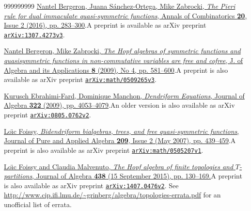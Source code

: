 \documentclass[numbers=enddot,12pt,final,onecolumn,notitlepage,abstracton]{scrartcl}%
\theoremstyle{definition}
\begin{document}
\begin{thebibliography}{999999999}
%
\href{https://doi.org/10.1007/s00026-016-0303-3}{Nantel Bergeron, Juana
S\'{a}nchez-Ortega, Mike Zabrocki, \textit{The Pieri rule for dual immaculate
quasi-symmetric functions}, Annals of Combinatorics \textbf{20}, Issue 2
(2016), pp. 283--300}.\newline A preprint is available as arXiv preprint
\texttt{\href{https://arxiv.org/abs/1307.4273v3}{arXiv:1307.4273v3}}.

%
\href{https://doi.org/10.1142/S0219498809003485}{Nantel Bergeron, Mike
Zabrocki, \textit{The Hopf algebras of symmetric functions and quasisymmetric
functions in non-commutative variables are free and cofree}, J. of Algebra and
its Applications \textbf{8} (2009), No 4, pp. 581--600}.\newline A preprint is
also available as arXiv preprint
\texttt{\href{https://arxiv.org/abs/math/0509265v3}{arXiv:math/0509265v3}}.



%
\href{https://doi.org/10.1016/j.jalgebra.2009.06.002}{Kurusch Ebrahimi-Fard,
Dominique Manchon, \textit{Dendriform Equations}, Journal of Algebra
\textbf{322} (2009), pp. 4053--4079}.\newline An older version is also
available as arXiv preprint
\texttt{\href{https://arxiv.org/abs/0805.0762v2}{arXiv:0805.0762v2}}.

%
\href{https://doi.org/10.1016/j.jpaa.2006.06.005}{Lo\"{\i}c Foissy,
\textit{Bidendriform bialgebras, trees, and free quasi-symmetric functions},
Journal of Pure and Applied Algebra \textbf{209}, Issue 2 (May 2007), pp.
439--459}.\newline A preprint is also available as arXiv preprint
\texttt{\href{https://arxiv.org/abs/math/0505207v1}{arXiv:math/0505207v1}}.

%
\href{https://doi.org/10.1016/j.jalgebra.2015.04.024}{Lo\"{\i}c Foissy and
Claudia Malvenuto, \textit{The Hopf algebra of finite topologies and }%
$T$\textit{-partitions}, Journal of Algebra \textbf{438} (15 September 2015),
pp. 130--169.}\newline A preprint is also available as arXiv preprint
\texttt{\href{https://arxiv.org/abs/1407.0476v2}{arXiv:1407.0476v2}}.\newline
See \url{http://www.cip.ifi.lmu.de/~grinberg/algebra/topologies-errata.pdf}
for an unofficial list of errata.


\end{thebibliography}
\end{document}
